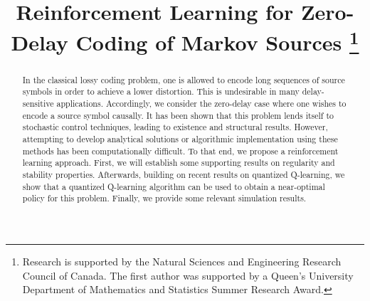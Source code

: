 \documentclass[conference, draftcls, onecolumn]{IEEEtran}
\begin{document}
\title{Reinforcement Learning for Zero-Delay Coding of Markov Sources
    \thanks{Research is supported by the Natural Sciences and Engineering Research Council of Canada. The first author was supported by a Queen's University Department of Mathematics and Statistics Summer Research Award.}
}

\author{
    \and
    \and
    }

\maketitle

\begin{abstract}
    In the classical lossy coding problem, one is allowed to encode long sequences of source symbols in order to achieve a lower distortion. This is undesirable in many delay-sensitive applications. Accordingly, we consider the zero-delay case where one wishes to encode a source symbol causally. It has been shown that this problem lends itself to stochastic control techniques, leading to existence and structural results. However, attempting to develop analytical solutions or algorithmic implementation using these methods has been computationally difficult. To that end, we propose a reinforcement learning approach. First, we will establish some supporting results on regularity and stability properties. Afterwards, building on recent results on quantized Q-learning, we show that a quantized Q-learning algorithm can be used to obtain a near-optimal policy for this problem. Finally, we provide some relevant simulation results.
\end{abstract}
\end{document}
